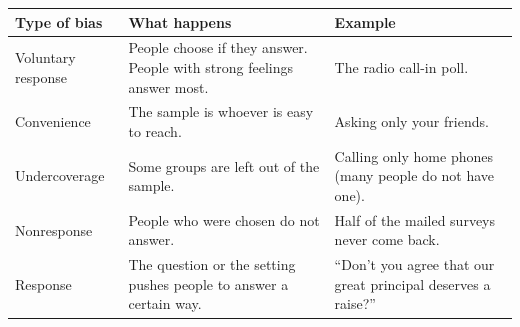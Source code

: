 \documentclass[11pt]{article}
\begin{document}
\vspace{0.3em}
\begin{tabular}{|>{\raggedright\arraybackslash}p{1.3in}|>{\raggedright\arraybackslash}p{2.6in}|>{\raggedright\arraybackslash}p{2.5in}|}\hline
\textbf{Type of bias} & \textbf{What happens} & \textbf{Example}\\ \hline
Voluntary response & People choose if they answer. People with strong feelings answer most. & The radio call-in poll.\\ \hline
Convenience & The sample is whoever is easy to reach. & Asking only your friends.\\ \hline
Undercoverage & Some groups are left out of the sample. & Calling only home phones (many people do not have one).\\ \hline
Nonresponse & People who were chosen do not answer. & Half of the mailed surveys never come back.\\ \hline
Response & The question or the setting pushes people to answer a certain way. & ``Don't you agree that our great principal deserves a raise?''\\ \hline
\end{tabular}

\partner
\end{document}
